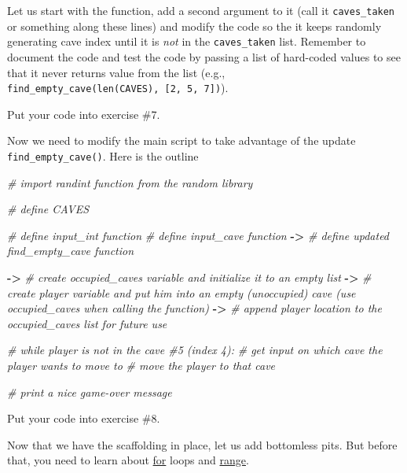 \documentclass[
]{book}
\newenvironment{Shaded}{\begin{snugshade}}{\end{snugshade}}
\newcommand{\CommentTok}[1]{\textcolor[rgb]{0.56,0.35,0.01}{\textit{#1}}}
\newcommand{\OperatorTok}[1]{\textcolor[rgb]{0.81,0.36,0.00}{\textbf{#1}}}
\begin{document}
Let us start with the function, add a second argument to it (call it \texttt{caves\_taken} or something along these lines) and modify the code so the it keeps randomly generating cave index until it is \emph{not} in the \texttt{caves\_taken} list. Remember to document the code and test the code by passing a list of hard-coded values to see that it never returns value from the list (e.g., \texttt{find\_empty\_cave(len(CAVES),\ {[}2,\ 5,\ 7{]})}).

Put your code into exercise \#7.

Now we need to modify the main script to take advantage of the update \texttt{find\_empty\_cave()}. Here is the outline

\begin{Shaded}
\begin{Highlighting}[]
\CommentTok{\# import randint function from the random library}

\CommentTok{\# define CAVES}

\CommentTok{\# define input\_int function}
\CommentTok{\# define input\_cave function}
\OperatorTok{{-}\textgreater{}} \CommentTok{\# define updated find\_empty\_cave function }

\OperatorTok{{-}\textgreater{}} \CommentTok{\# create \textasciigrave{}occupied\_caves\textasciigrave{} variable and initialize it to an empty list}
\OperatorTok{{-}\textgreater{}} \CommentTok{\# create \textasciigrave{}player\textasciigrave{} variable and put him into an empty (unoccupied) cave (use \textasciigrave{}occupied\_caves\textasciigrave{} when calling the function)}
\OperatorTok{{-}\textgreater{}} \CommentTok{\# append player location to the \textasciigrave{}occupied\_caves\textasciigrave{} list for future use}

\CommentTok{\# while player is not in the cave \#5 (index 4):}
    \CommentTok{\# get input on which cave the player wants to move to}
    \CommentTok{\# move the player to that cave}

\CommentTok{\# print a nice game{-}over message}
\end{Highlighting}
\end{Shaded}

Put your code into exercise \#8.

Now that we have the scaffolding in place, let us add bottomless pits. But before that, you need to learn about \href{https://docs.python.org/3/tutorial/controlflow.html\#for-statements}{for} loops and \href{https://docs.python.org/3/tutorial/controlflow.html\#the-range-function}{range}.
\end{document}
